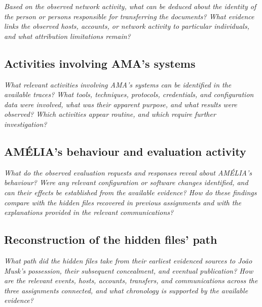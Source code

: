 \documentclass[11pt,a4paper,final,oneside]{article}
\begin{document}
\textit{Based on the observed network activity, what can be deduced about the identity of the person or persons responsible for transferring the documents? What evidence links the observed hosts, accounts, or network activity to particular individuals, and what attribution limitations remain?}


\subsection{Activities involving AMA's systems}

\textit{What relevant activities involving AMA's systems can be identified in the available traces? What tools, techniques, protocols, credentials, and configuration data were involved, what was their apparent purpose, and what results were observed? Which activities appear routine, and which require further investigation?}


\subsection{AMÉLIA's behaviour and evaluation activity}

\textit{What do the observed evaluation requests and responses reveal about AMÉLIA's behaviour? Were any relevant configuration or software changes identified, and can their effects be established from the available evidence? How do these findings compare with the hidden files recovered in previous assignments and with the explanations provided in the relevant communications?}


\subsection{Reconstruction of the hidden files' path}

\textit{What path did the hidden files take from their earliest evidenced sources to João Musk's possession, their subsequent concealment, and eventual publication? How are the relevant events, hosts, accounts, transfers, and communications across the three assignments connected, and what chronology is supported by the available evidence?}
\end{document}

